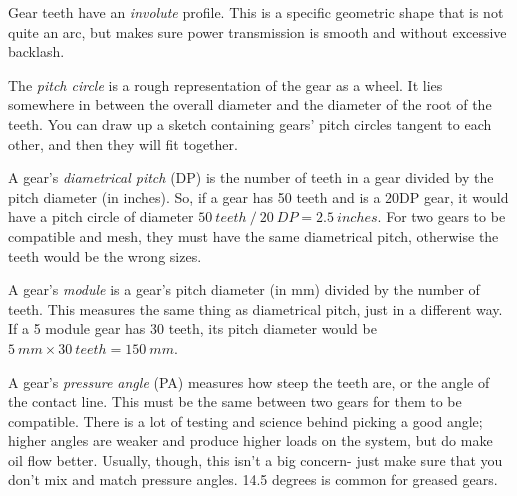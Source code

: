 \documentclass[10pt,letterpaper]{book}
\begin{document}
\begin{asparaenum}[a)]
	\item Gear teeth have an \textit{involute} profile. This is a specific geometric shape that is not quite an arc, but makes sure power transmission is smooth and without excessive backlash.
	\item The \textit{pitch circle} is a rough representation of the gear as a wheel. It lies somewhere in between the overall diameter and the diameter of the root of the teeth. You can draw up a sketch containing gears' pitch circles tangent to each other, and then they will fit together.
	\item A gear's \textit{diametrical pitch} (DP) is the number of teeth in a gear divided by the pitch diameter (in inches). So, if a gear has 50 teeth and is a 20DP gear, it would have a pitch circle of diameter $50 \ teeth \ / \ 20 \ DP = 2.5 \ inches$. For two gears to be compatible and mesh, they must have the same diametrical pitch, otherwise the teeth would be the wrong sizes.
	\item A gear's \textit{module} is a gear's pitch diameter (in mm) divided by the number of teeth. This measures the same thing as diametrical pitch, just in a different way. If a 5 module gear has 30 teeth, its pitch diameter would be $5 \ mm \times 30 \ teeth = 150 \ mm$.
	\item A gear's \textit{pressure angle} (PA) measures how steep the teeth are, or the angle of the contact line. This must be the same between two gears for them to be compatible. There is a lot of testing and science behind picking a good angle; higher angles are weaker and produce higher loads on the system, but do make oil flow better. Usually, though, this isn't a big concern- just make sure that you don't mix and match pressure angles. 14.5 degrees is common for greased gears.
\end{asparaenum}
\end{document}
